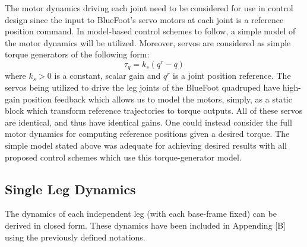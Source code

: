 			The motor dynamics driving each joint need to be considered for use in control design since the input to BlueFoot's servo motors at each joint is a reference position command. In model-based control schemes to follow, a simple model of the motor dynamics will be utilized. Moreover, servos are considered as simple torque generators of the following form:
				\begin{equation}
					\tau_{q} = k_{s}(q^{r}-q)
					\label{eq::servo_control_dynamics}
				\end{equation}
			where $k_{s}>0$ is a constant, scalar gain and $q^{r}$ is a joint position reference. The servos being utilized to drive the leg joints of the BlueFoot quadruped have high-gain position feedback which allows us to model the motors, simply, as a static block which transform reference trajectories to torque outputs. All of these servos are identical, and thus have identical gains. One could instead consider the full motor dynamics for computing reference positions given a desired torque. The simple model stated above was adequate for achieving desired results with all proposed control schemes which use this torque-generator model.


		\subsection{Single Leg Dynamics}
			
			The dynamics of each independent leg (with each base-frame fixed) can be derived in closed form. These dynamics have been included in Appending [B] using the previously defined notations.


